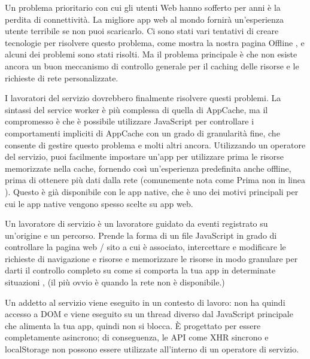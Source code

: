 \documentclass[italian]{article}
\begin{document}

Un problema prioritario con cui gli utenti Web hanno sofferto per anni è la perdita di connettività. La migliore app web al mondo fornirà un'esperienza utente terribile se non puoi scaricarlo. Ci sono stati vari tentativi di creare tecnologie per risolvere questo problema, come mostra la nostra pagina Offline , e alcuni dei problemi sono stati risolti. Ma il problema principale è che non esiste ancora un buon meccanismo di controllo generale per il caching delle risorse e le richieste di rete personalizzate. 

I lavoratori del servizio dovrebbero finalmente risolvere questi problemi. La sintassi del service worker è più complessa di quella di AppCache, ma il compromesso è che è possibile utilizzare JavaScript per controllare i comportamenti impliciti di AppCache con un grado di granularità fine, che consente di gestire questo problema e molti altri ancora. Utilizzando un operatore del servizio, puoi facilmente impostare un'app per utilizzare prima le risorse memorizzate nella cache, fornendo così un'esperienza predefinita anche offline, prima di ottenere più dati dalla rete (comunemente nota come Prima non in linea ). Questo è già disponibile con le app native, che è uno dei motivi principali per cui le app native vengono spesso scelte su app web.

Un lavoratore di servizio è un lavoratore guidato da eventi registrato su un'origine e un percorso. Prende la forma di un file JavaScript in grado di controllare la pagina web / sito a cui è associato, intercettare e modificare le richieste di navigazione e risorse e memorizzare le risorse in modo granulare per darti il controllo completo su come si comporta la tua app in determinate situazioni , (il più ovvio è quando la rete non è disponibile.)

Un addetto al servizio viene eseguito in un contesto di lavoro: non ha quindi accesso a DOM e viene eseguito su un thread diverso dal JavaScript principale che alimenta la tua app, quindi non si blocca. È progettato per essere completamente asincrono; di conseguenza, le API come XHR sincrono e localStorage non possono essere utilizzate all'interno di un operatore di servizio.
\end{document}
